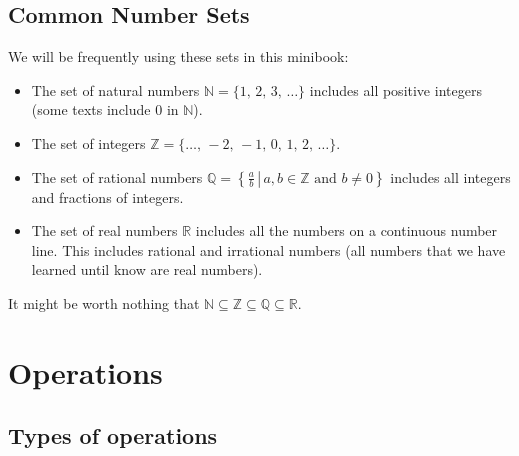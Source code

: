\documentclass[
]{book}
\providecommand{\tightlist}{%
  \setlength{\itemsep}{0pt}\setlength{\parskip}{0pt}}
\theoremstyle{definition}
\theoremstyle{definition}
\theoremstyle{definition}
\theoremstyle{definition}
\theoremstyle{remark}
\begin{document}
\hypertarget{common-number-sets}{%
\subsection{Common Number Sets}\label{common-number-sets}}

We will be frequently using these sets in this minibook:

\begin{itemize}
\tightlist
\item
  The set of natural numbers \(\mathbb{N} = \{1,\, 2,\, 3,\, \dots\}\) includes all positive integers (some texts include \(0\) in \(\mathbb{N}\)).
\item
  The set of integers \(\mathbb{Z} = \{\dots,\, -2,\, -1,\, 0,\, 1,\, 2,\, \dots\}\).
\item
  The set of rational numbers \(\displaystyle\mathbb{Q} = \left\{\left.\frac{a}{b}\,\right\vert\, a,b \in \mathbb{Z} \text{ and } b \ne 0 \right\}\) includes all integers and fractions of integers.
\item
  The set of real numbers \(\mathbb{R}\) includes all the numbers on a continuous number line. This includes rational and irrational numbers (all numbers that we have learned until know are real numbers).
\end{itemize}

It might be worth nothing that \(\mathbb{N} \subseteq \mathbb{Z} \subseteq \mathbb{Q} \subseteq \mathbb{R}\).

\hypertarget{operations}{%
\section{Operations}\label{operations}}

\hypertarget{types-of-operations}{%
\subsection{Types of operations}\label{types-of-operations}}
\end{document}
